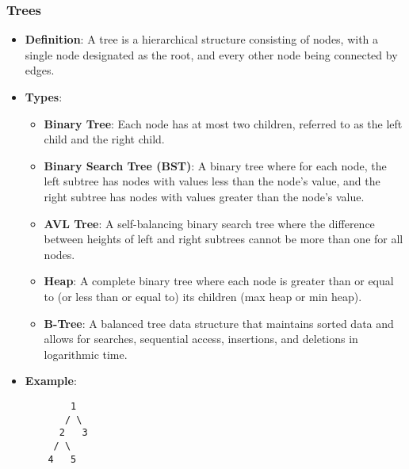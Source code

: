 \documentclass{article}
\begin{document}
\subsubsection{Trees}
\begin{itemize}
    \item \textbf{Definition}: A tree is a hierarchical structure consisting of nodes, with a single node designated as the root, and every other node being connected by edges.
    \item \textbf{Types}:
    \begin{itemize}
        \item \textbf{Binary Tree}: Each node has at most two children, referred to as the left child and the right child.
        \item \textbf{Binary Search Tree (BST)}: A binary tree where for each node, the left subtree has nodes with values less than the node’s value, and the right subtree has nodes with values greater than the node’s value.
        \item \textbf{AVL Tree}: A self-balancing binary search tree where the difference between heights of left and right subtrees cannot be more than one for all nodes.
        \item \textbf{Heap}: A complete binary tree where each node is greater than or equal to (or less than or equal to) its children (max heap or min heap).
        \item \textbf{B-Tree}: A balanced tree data structure that maintains sorted data and allows for searches, sequential access, insertions, and deletions in logarithmic time.
    \end{itemize}
    \item \textbf{Example}: 
    \begin{verbatim}
        1
       / \
      2   3
     / \
    4   5
    \end{verbatim}
\end{itemize}
\end{document}
